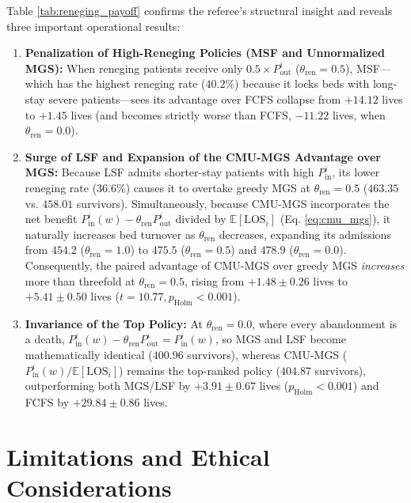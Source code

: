 \documentclass[final,5p,times,twocolumn]{elsarticle}
\begin{document}
Table \ref{tab:reneging_payoff} confirms the referee's structural insight and reveals three important operational results:
\begin{enumerate}[(1)]
    \item \textbf{Penalization of High-Reneging Policies (MSF and Unnormalized MGS):} When reneging patients receive only $0.5 \times P_{\text{out}}^i$ ($\theta_{\text{ren}} = 0.5$), MSF---which has the highest reneging rate ($40.2\%$) because it locks beds with long-stay severe patients---sees its advantage over FCFS collapse from $+14.12$ lives to $+1.45$ lives (and becomes strictly worse than FCFS, $-11.22$ lives, when $\theta_{\text{ren}} = 0.0$).
    \item \textbf{Surge of LSF and Expansion of the CMU-MGS Advantage over MGS:} Because LSF admits shorter-stay patients with high $P_{\text{in}}^i$, its lower reneging rate ($36.6\%$) causes it to overtake greedy MGS at $\theta_{\text{ren}} = 0.5$ ($463.35$ vs. $458.01$ survivors). Simultaneously, because CMU-MGS incorporates the net benefit $P_{\text{in}}^i(w) - \theta_{\text{ren}} P_{\text{out}}^i$ divided by $\mathbb{E}[\text{LOS}_i]$ (Eq. \ref{eq:cmu_mgs}), it naturally increases bed turnover as $\theta_{\text{ren}}$ decreases, expanding its admissions from $454.2$ ($\theta_{\text{ren}}=1.0$) to $475.5$ ($\theta_{\text{ren}}=0.5$) and $478.9$ ($\theta_{\text{ren}}=0.0$). Consequently, the paired advantage of CMU-MGS over greedy MGS \textit{increases} more than threefold at $\theta_{\text{ren}} = 0.5$, rising from $+1.48 \pm 0.26$ lives to $\mathbf{+5.41 \pm 0.50}$ lives ($t = 10.77, p_{\text{Holm}} < 0.001$).
    \item \textbf{Invariance of the Top Policy:} At $\theta_{\text{ren}} = 0.0$, where every abandonment is a death, $P_{\text{in}}^i(w) - \theta_{\text{ren}} P_{\text{out}}^i = P_{\text{in}}^i(w)$, so MGS and LSF become mathematically identical ($400.96$ survivors), whereas CMU-MGS ($P_{\text{in}}^i(w)/\mathbb{E}[\text{LOS}_i]$) remains the top-ranked policy ($404.87$ survivors), outperforming both MGS/LSF by $+3.91 \pm 0.67$ lives ($p_{\text{Holm}} < 0.001$) and FCFS by $+29.84 \pm 0.86$ lives.
\end{enumerate}

\section{Limitations and Ethical Considerations}
\label{sec:limitations}
\end{document}
